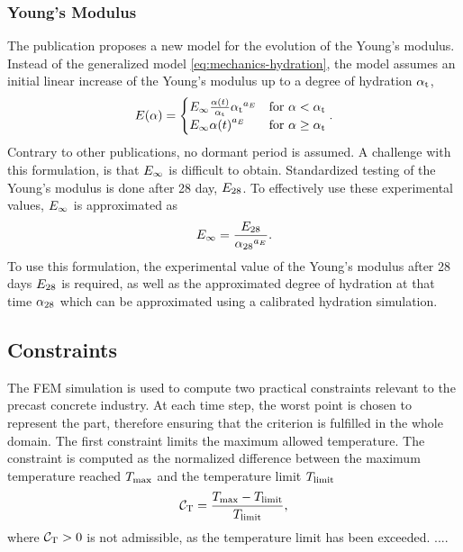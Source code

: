 \subsubsection{Young's Modulus}
The publication \cite{car_2016_mamt} proposes a new model for the evolution of the Young's modulus.
Instead of the generalized model \eqref{eq:mechanics-hydration}, the model assumes an initial linear increase of the Young's modulus up to a degree of hydration $\alpha_{\text{t}}$,
\begin{align}
	E(\alpha) = 
	\begin{cases}
		E_\infty \frac{\alpha(t)}{\alpha_{\text{t}}}{\alpha_{\text{t}}}^{a_{E}}   
		& \text{for $\alpha < \alpha_{\text{t}}$}\\
		E_\infty {\alpha(t)}^{a_{E}}  
		& \text{for $\alpha \ge \alpha_{\text{t}}$}
	\end{cases}\label{eq:EwrtDOH}.
\end{align}
Contrary to other publications, no dormant period is assumed.
A challenge with this formulation, is that $E_\infty$ is difficult to obtain.
Standardized testing of the Young's modulus is done after 28 day, $E_{28}$.
To effectively use these experimental values, $E_\infty$ is approximated as
\begin{align}
	E_\infty = \dfrac{E_{28}}{{\alpha_{28}}^{a_{E}}}.
\end{align}
To use this formulation, the experimental value of the Young's modulus after 28 days $E_{28}$ is required, as well as the approximated degree of hydration at that time $\alpha_{28}$ which can be approximated using a calibrated hydration simulation.


\subsection{Constraints}
The FEM simulation is used to compute two practical constraints relevant to the precast concrete industry.
At each time step, the worst point is chosen to represent the part, therefore ensuring that the criterion is fulfilled in the whole domain.
The first constraint limits the maximum allowed temperature.
The constraint is computed as the normalized difference between the maximum temperature reached $T_{\text{max}}$ and the temperature limit $T_{\text{limit}}$ 
\begin{align}
	\mathcal{C}_{\text{T}} = \frac{T_{\text{max}} - T_{\text{limit}}}{T_{\text{limit}}}, \label{eq:concstraintT}
\end{align}
where $\mathcal{C}_{\text{T}} > 0$ is not admissible, as the temperature limit has been exceeded.
....


